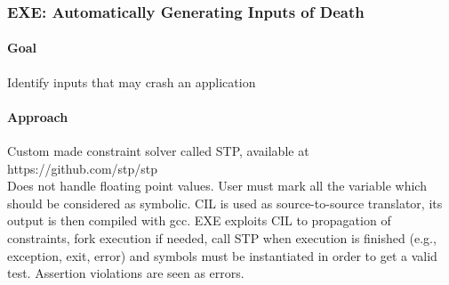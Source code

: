 \subsubsection{\cite{EXE-CCS06} EXE: Automatically Generating Inputs of Death} 

\paragraph{Goal}
Identify inputs that may crash an application

\paragraph{Approach}
Custom made constraint solver called STP, available at https://github.com/stp/stp\\


Does not handle floating point values. User must mark all the variable which should be considered as symbolic. CIL is used as source-to-source translator, its output is then compiled with gcc. EXE exploits CIL to propagation of constraints, fork execution if needed,  call STP when execution is finished (e.g., exception, exit, error) and symbols must be instantiated in order to get a valid test. Assertion violations are seen as errors.

